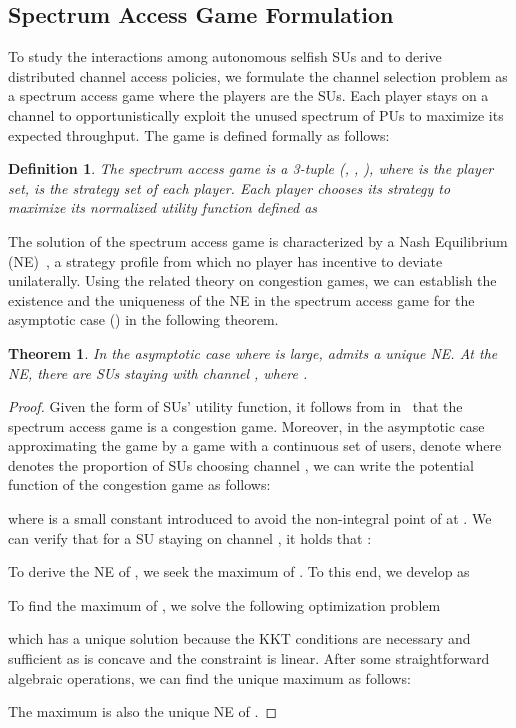\documentclass[12pt, onecolumn]{IEEEtran}
\theoremstyle{plain}
\newtheorem{theorem}{Theorem}
\newtheorem{definition}{Definition}
\theoremstyle{definition}
\begin{document}
\subsection{Spectrum Access Game Formulation}
\label{subsec:congestion_game}

To study the interactions among autonomous selfish SUs and to derive distributed channel access policies, we formulate the channel selection problem as a spectrum access game where the players are the SUs. Each player  stays on a channel  to opportunistically exploit the unused spectrum of PUs to maximize its expected throughput.
The game is defined formally as follows:

\begin{definition}
The spectrum access game  is a 3-tuple (, , ), where  is the player set, 
is the strategy set of each player. Each player  chooses its strategy 
to maximize its normalized utility function  defined as

\end{definition}





The solution of the spectrum access game  is characterized by a
Nash Equilibrium (NE)~\cite{Myerson91}, a strategy profile from which no player has incentive to deviate unilaterally. Using the related theory on congestion games, we can establish the existence and the uniqueness of the NE in the spectrum access game  for the asymptotic case () in the following theorem.

\begin{theorem}
In the asymptotic case where  is large,  admits a unique NE. At the NE, there are  SUs staying with channel , where .
\label{th:ne_congestion_game}
\end{theorem}

\begin{proof}
Given the form of SUs' utility function, it follows from in~\cite{Milchtaich96} that the spectrum access game is a congestion game. Moreover, in the asymptotic case approximating the game  by a game with a continuous set of users, denote  where  denotes the proportion of SUs choosing channel , we can write the potential function of the congestion game as follows:

where  is a small constant introduced to avoid the non-integral point of  at . We can verify that for a SU  staying on channel , it holds that :


To derive the NE of , we seek the maximum of . To this end, we develop  as


To find the maximum of , we solve the following optimization problem

which has a unique solution because the KKT conditions are necessary and sufficient as  is concave and the constraint is linear. After some straightforward algebraic operations, we can find the unique maximum  as follows:

The maximum  is also the unique NE of .
\end{proof}
\end{document}
